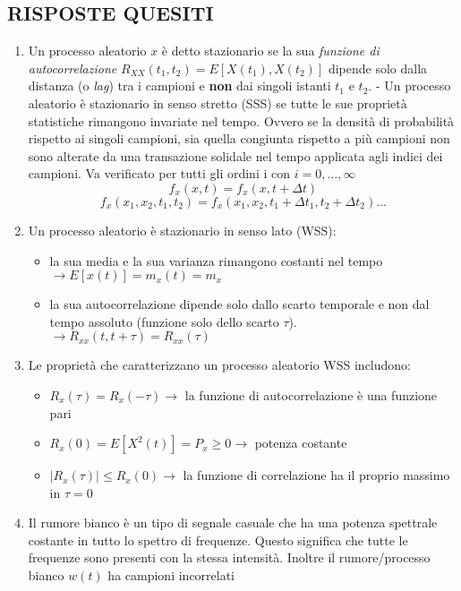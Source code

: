 \documentclass[
]{article}
\providecommand{\tightlist}{%
  \setlength{\itemsep}{0pt}\setlength{\parskip}{0pt}}
\begin{document}
\newpage

\subsection{RISPOSTE QUESITI}\label{risposte-quesiti}

\begin{enumerate}
\def\labelenumi{\arabic{enumi}.}
\item
  Un processo aleatorio \(x\) è detto stazionario se la sua
  \emph{funzione di autocorrelazione}
  \(R_{XX}(t_1, t_2) = E[X(t_1), X(t_2)]\) dipende solo dalla distanza
  (o \emph{lag}) tra i campioni e \textbf{non} dai singoli istanti
  \(t_1\) e \(t_2\). - Un processo aleatorio è stazionario in senso
  stretto (SSS) se tutte le sue proprietà statistiche rimangono
  invariate nel tempo. Ovvero se la densità di probabilità rispetto ai
  singoli campioni, sia quella congiunta rispetto a più campioni non
  sono alterate da una transazione solidale nel tempo applicata agli
  indici dei campioni. Va verificato per tutti gli ordini i con
  \(i= 0, \dots, \infty\) \[
  f_x (x, t) = f_x(x, t+ \Delta t)\] \[
  f_x(x_1, x_2, t_1, t_2) = f_x(x_1, x_2, t_1 + \Delta t_1, t_2 + \Delta t_2)...
  \]
\item
  Un processo aleatorio è stazionario in senso lato (WSS):

  \begin{itemize}
  \tightlist
  \item
    la sua media e la sua varianza rimangono costanti nel tempo
    \(\to E[x(t)] = m_x(t) = m_x\)\\
  \item
    la sua autocorrelazione dipende solo dallo scarto temporale e non
    dal tempo assoluto (funzione solo dello scarto \(\tau\)).
    \(\to R_{xx}(t, t+\tau) = R_{xx}(\tau)\)
  \end{itemize}
\item
  Le proprietà che caratterizzano un processo aleatorio WSS includono:

  \begin{itemize}
  \item
    \(R_x(\tau) = R_x(-\tau) \to\) la funzione di autocorrelazione è una
    funzione pari
  \item
    \(R_x(0)= E[X^2(t)] = P_x \geq 0 \to\) potenza costante
  \item
    \(|R_x(\tau)| \leq R_x(0) \to\) la funzione di correlazione ha il
    proprio massimo in \(\tau = 0\)
  \end{itemize}
\item
  Il rumore bianco è un tipo di segnale casuale che ha una potenza
  spettrale costante in tutto lo spettro di frequenze. Questo significa
  che tutte le frequenze sono presenti con la stessa intensità. Inoltre
  il rumore/processo bianco \(w(t)\) ha campioni incorrelati


\end{enumerate}
\end{document}
